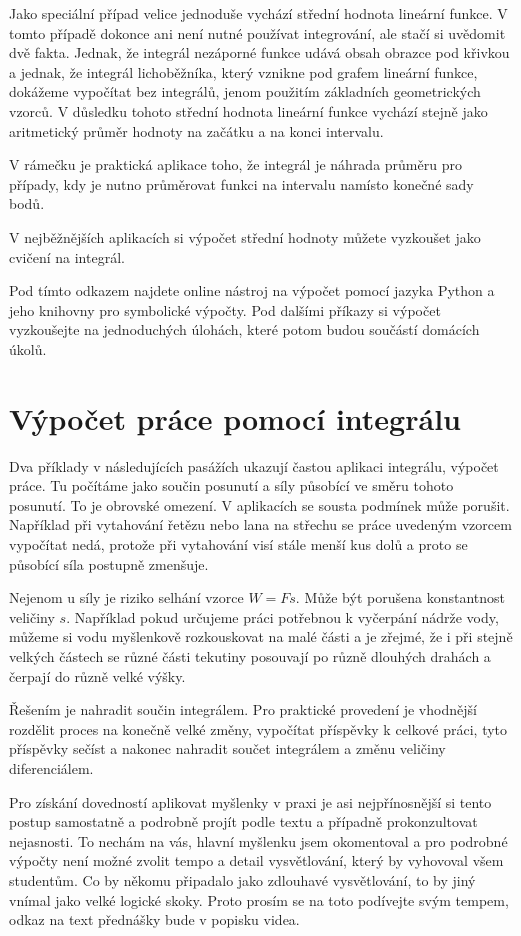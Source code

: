 \documentclass[12pt]{article}
\begin{document}
Jako speciální případ velice jednoduše vychází střední hodnota lineární funkce. V tomto případě dokonce ani není nutné používat integrování, ale stačí si uvědomit dvě fakta. Jednak, že integrál nezáporné funkce udává obsah obrazce pod křivkou a jednak, že integrál lichoběžníka, který vznikne pod grafem lineární funkce, dokážeme vypočítat bez integrálů, jenom použitím základních geometrických vzorců. V důsledku tohoto střední hodnota lineární funkce vychází stejně jako aritmetický průměr hodnoty na začátku a na konci intervalu.

V rámečku je praktická aplikace toho, že integrál je náhrada průměru pro případy, kdy je nutno průměrovat funkci na intervalu namísto konečné sady bodů.


V nejběžnějších aplikacích si výpočet střední hodnoty můžete vyzkoušet jako cvičení na integrál.

Pod tímto odkazem najdete online nástroj na výpočet pomocí jazyka Python a jeho knihovny pro symbolické výpočty. Pod dalšími příkazy si výpočet vyzkoušejte na jednoduchých úlohách, které potom budou součástí domácích úkolů.


\section*{Výpočet práce pomocí integrálu}

Dva příklady v následujících pasážích ukazují častou aplikaci integrálu, výpočet práce. Tu počítáme jako součin posunutí a síly působící ve směru tohoto posunutí. To je obrovské omezení. V aplikacích se sousta podmínek může porušit. Například při vytahování řetězu nebo lana na střechu se práce uvedeným vzorcem vypočítat nedá, protože při vytahování visí stále menší kus dolů a proto se působící síla postupně zmenšuje.

Nejenom u síly je riziko selhání vzorce $W=Fs$. Může být porušena konstantnost veličiny $s$. Například pokud určujeme práci potřebnou k vyčerpání nádrže vody, můžeme si vodu myšlenkově rozkouskovat na malé části a je zřejmé, že i při stejně velkých částech se různé části tekutiny posouvají po různě dlouhých drahách a čerpají do různě velké výšky.

Řešením je nahradit součin integrálem. Pro praktické provedení je vhodnější rozdělit proces na konečně velké změny, vypočítat příspěvky k celkové práci, tyto příspěvky sečíst a nakonec nahradit součet integrálem a změnu veličiny diferenciálem.

Pro získání dovedností aplikovat myšlenky v praxi je asi nejpřínosnější si tento postup samostatně a podrobně projít podle textu a případně prokonzultovat nejasnosti. To nechám na vás, hlavní myšlenku jsem okomentoval a pro podrobné výpočty není možné zvolit tempo a detail vysvětlování, který by vyhovoval všem studentům. Co by někomu připadalo jako zdlouhavé vysvětlování, to by jiný vnímal jako velké logické skoky. Proto prosím se na toto podívejte svým tempem, odkaz na text přednášky bude v popisku videa.
\end{document}
